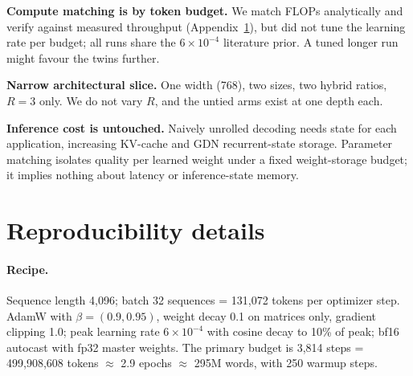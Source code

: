 \documentclass[11pt]{article}
\begin{document}
\textbf{Compute matching is by token budget.} We match FLOPs analytically and verify against measured throughput (Appendix~\ref{sec:repro}), but did not tune the learning rate per budget; all runs share the $6\times10^{-4}$ literature prior. A tuned longer run might favour the twins further.

\textbf{Narrow architectural slice.} One width (768), two sizes, two hybrid ratios, $R = 3$ only. We do not vary $R$, and the untied arms exist at one depth each.

\textbf{Inference cost is untouched.} Naively unrolled decoding needs state for each application, increasing KV-cache and GDN recurrent-state storage. Parameter matching isolates quality per learned weight under a fixed weight-storage budget; it implies nothing about latency or inference-state memory.

%



\appendix

\section{Reproducibility details}
\label{sec:repro}

\paragraph{Recipe.} Sequence length 4{,}096; batch 32 sequences = 131{,}072 tokens per optimizer step. AdamW \citep{loshchilov2019adamw} with $\beta = (0.9, 0.95)$, weight decay 0.1 on matrices only, gradient clipping 1.0; peak learning rate $6\times10^{-4}$ with cosine decay to 10\% of peak; bf16 autocast with fp32 master weights. The primary budget is 3{,}814 steps = 499{,}908{,}608 tokens $\approx$ 2.9 epochs $\approx$ 295M words, with 250 warmup steps.
\end{document}
